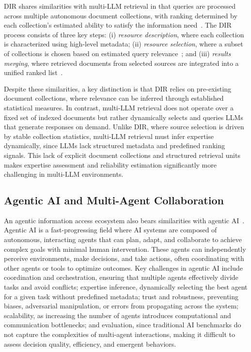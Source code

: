 DIR shares similarities with multi-LLM retrieval in that queries are processed across multiple autonomous document collections, with ranking determined by each collection's estimated ability to satisfy the information need~\cite{Callan1995}. The DIR process consists of three key steps: (i) \textit{resource description}, where each collection is characterized using high-level metadata; (ii) \textit{resource selection}, where a subset of collections is chosen based on estimated query relevance~\cite{Callan1995, Callan2000}; and (iii) \textit{results merging}, where retrieved documents from selected sources are integrated into a unified ranked list~\cite{Crestani2013}.

Despite these similarities, a key distinction is that DIR relies on pre-existing document collections, where relevance can be inferred through established statistical measures. In contrast, multi-LLM retrieval does not operate over a fixed set of indexed documents but rather dynamically selects and queries LLMs that generate responses on demand. Unlike DIR, where source selection is driven by stable collection statistics, multi-LLM retrieval must infer expertise dynamically, since LLMs lack structured metadata and predefined ranking signals. This lack of explicit document collections and structured retrieval units makes expertise assessment and reliability estimation significantly more challenging in multi-LLM environments.

\subsection{Agentic AI and Multi-Agent Collaboration}

An agentic information access ecosystem also bears similarities with agentic AI~\cite{acharya2025agentic}. Agentic AI is a fast-progressing field where AI systems are composed of autonomous, interacting agents that can plan, adapt, and collaborate to achieve complex goals with minimal human intervention. These agents can independently perceive environments, make decisions, and take actions, often coordinating with other agents or tools to optimize outcomes. Key challenges in agentic AI include coordination and orchestration, ensuring that multiple agents effectively divide tasks and avoid conflicts; expertise inference, dynamically selecting the best agent for a given task without predefined metadata; trust and robustness, preventing biases, adversarial manipulation, or errors from propagating across the system; scalability, as increasing the number of agents introduces computational and communication bottlenecks; and evaluation, since traditional AI benchmarks do not capture the complexities of multi-agent interactions, making it difficult to assess decision quality, efficiency, and emergent behaviors.

